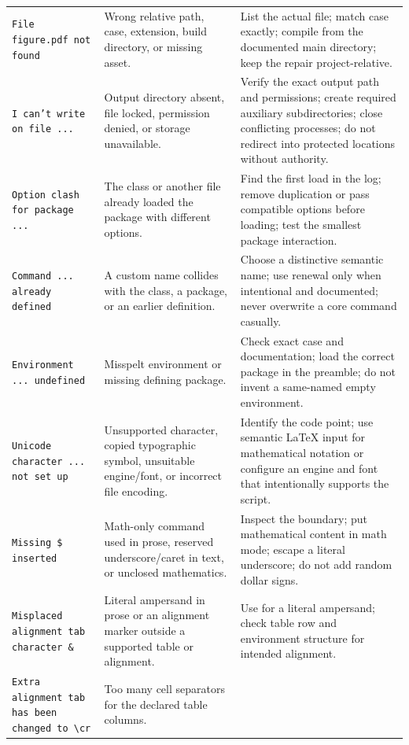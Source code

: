 \begin{longtable}{@{}p{}p{}p{}@{}}
\addlinespace
\texttt{File figure.pdf not found} &
Wrong relative path, case, extension, build directory, or missing asset. &
List the actual file; match case exactly; compile from the documented main
directory; keep the repair project-relative. \\
\addlinespace
\texttt{I can't write on file ...} &
Output directory absent, file locked, permission denied, or storage unavailable. &
Verify the exact output path and permissions; create required auxiliary
subdirectories; close conflicting processes; do not redirect into protected
locations without authority. \\
\addlinespace
\texttt{Option clash for package ...} &
The class or another file already loaded the package with different options. &
Find the first load in the log; remove duplication or pass compatible options
before loading; test the smallest package interaction. \\
\addlinespace
\texttt{Command ... already defined} &
A custom name collides with the class, a package, or an earlier definition. &
Choose a distinctive semantic name; use renewal only when intentional and
documented; never overwrite a core command casually. \\
\addlinespace
\texttt{Environment ... undefined} &
Misspelt environment or missing defining package. &
Check exact case and documentation; load the correct package in the preamble;
do not invent a same-named empty environment. \\
\addlinespace
\texttt{Unicode character ... not set up} &
Unsupported character, copied typographic symbol, unsuitable engine/font, or
incorrect file encoding. &
Identify the code point; use semantic \LaTeX{} input for mathematical notation or
configure an engine and font that intentionally supports the script. \\
\addlinespace
\texttt{Missing \$ inserted} &
Math-only command used in prose, reserved underscore/caret in text, or unclosed
mathematics. &
Inspect the boundary; put mathematical content in math mode; escape a literal
underscore; do not add random dollar signs. \\
\addlinespace
\texttt{Misplaced alignment tab character \&} &
Literal ampersand in prose or an alignment marker outside a supported table or
alignment. &
Use \cmd{\&} for a literal ampersand; check table row and environment structure
for intended alignment. \\
\addlinespace
\texttt{Extra alignment tab has been changed to \textbackslash cr} &
Too many cell separators for the declared table columns. &

\end{longtable}
